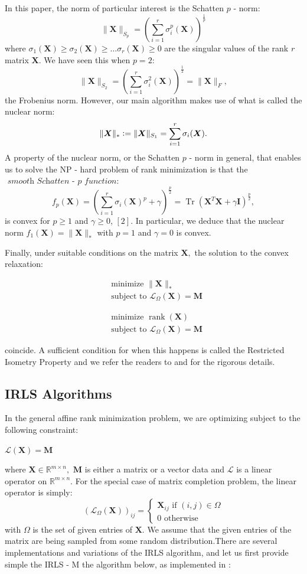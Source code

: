 \documentclass[12pt]{article}
\def \bX{\boldsymbol{X}}
\def \bI{\boldsymbol{I}}
\def \bM{\boldsymbol{M}}
\DeclareMathOperator{\rank}{rank}
\DeclareMathOperator{\Tr}{Tr}
\begin{document}
In this paper, the norm of particular interest is the Schatten $p$ - norm:
\[\|\bX\|_{S_p} = \left(\sum_{i=1}^r\sigma_i^p(\bX) \right)^{\frac 1p}\]
where $\sigma_1(\bX)\geq\sigma_2(\bX)\geq\dots \sigma_r(\bX)\geq 0 $ are the singular values of the rank $r$ matrix $\bX.$ We have seen this when $p = 2:$
\[\|\bX\|_{S_2} = \left(\sum_{i=1}^r\sigma_i^2(\bX) \right)^{\frac 12}  = \|\bX\|_F,\]
the Frobenius norm. However, our main algorithm makes use of what is called the nuclear norm:
\[\|\bX\|_*\vcentcolon =\|\bX\|_{S_1} = \sum_{i=1}^r\sigma_i(\bX).\]
A property of the nuclear norm, or the Schatten $p$ -  norm in general, that enables us to solve the NP - hard problem of rank minimization is that the $\textit{ smooth Schatten - p function}$:
\[f_p(\bX) = \left(\sum_{i=1}^r\sigma_i(\bX)^p+\gamma\right)^{\frac p2} = \Tr(\bX^T\bX+\gamma\bI)^{\frac p2},\]
is convex for $p\geq 1$ and $\gamma\geq 0 $, $[2]$. In particular, we deduce that the nuclear norm $f_1(\bX) = \|\bX\|_*$ with $p = 1$ and $\gamma = 0$ is convex. 

Finally, under suitable conditions on the matrix $\bX,$ the solution to the convex relaxation:

\begin{align}
 & \text{minimize } \|\bX\|_*\nonumber \\
 & \text{subject to } \mathcal{L}_\Omega(\bX) = \bM
\end{align}


    
\begin{align}
 & \text{minimize } \rank(\bX)\nonumber \\
 & \text{subject to } \mathcal{L}_\Omega(\bX) = \bM
\end{align}


coincide. A sufficient condition for when this happens is called the Restricted Isometry Property and we refer the readers to \cite{NNM} and \cite{IRLS- arxiv} for the rigorous details. 


\subsection{IRLS Algorithms}
In the general affine rank minimization problem, we are optimizing subject to the following constraint:

\centerline{$\mathcal{L}(\bX) = \bM$}

where $\bX\in\mathbb{R}^{m\times n},$ $\bM$ is either a matrix or a vector data and $\mathcal{L}$ is a linear operator on $\mathbb{R}^{m\times n}.$  For the special case of matrix completion problem, the linear operator is simply:
\[(\mathcal{L}_\Omega (\bX))_{ij} = \begin{cases}
\bX_{ij} \text{ if } (i,j)\in\Omega \\
0 \text{ otherwise}
\end{cases}\]
with $\Omega$ is the set of given entries of $\bX.$
 We assume that the given entries of the matrix are being sampled from some random distribution.There are several implementations and variations of the IRLS algorithm, and let us first provide simple the IRLS - M the algorithm below, as implemented in \cite{IRLS- arxiv}:
\end{document}
